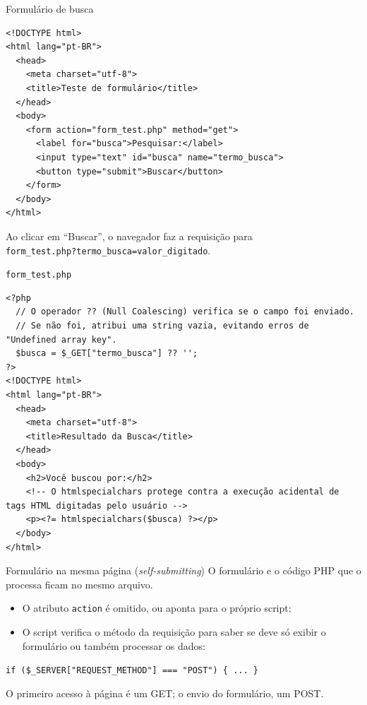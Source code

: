 \documentclass{beamer}
\begin{document}
\begin{frame}[fragile]{Formulário de busca}
	\begin{verbatim}
<!DOCTYPE html>
<html lang="pt-BR">
  <head>
    <meta charset="utf-8">
    <title>Teste de formulário</title>
  </head>
  <body>
    <form action="form_test.php" method="get">
      <label for="busca">Pesquisar:</label>
      <input type="text" id="busca" name="termo_busca">
      <button type="submit">Buscar</button>
    </form>
  </body>
</html>
	\end{verbatim}

	Ao clicar em ``Buscar'', o navegador faz a requisição para\\
	\texttt{form\_test.php?termo\_busca=valor\_digitado}.
\end{frame}

\begin{frame}[fragile]{\texttt{form\_test.php}}
	\begin{verbatim}
<?php
  // O operador ?? (Null Coalescing) verifica se o campo foi enviado.
  // Se não foi, atribui uma string vazia, evitando erros de "Undefined array key".
  $busca = $_GET["termo_busca"] ?? '';
?>
<!DOCTYPE html>
<html lang="pt-BR">
  <head>
    <meta charset="utf-8">
    <title>Resultado da Busca</title>
  </head>
  <body>
    <h2>Você buscou por:</h2>
    <!-- O htmlspecialchars protege contra a execução acidental de tags HTML digitadas pelo usuário -->
    <p><?= htmlspecialchars($busca) ?></p>
  </body>
</html>
	\end{verbatim}
\end{frame}

\begin{frame}{Formulário na mesma página (\emph{self-submitting})}
	O formulário e o código PHP que o processa ficam no mesmo arquivo.

	\vspace{0.2cm}
	\begin{itemize}
		\item O atributo \texttt{action} é omitido, ou aponta para o próprio
		      script;
		\item O script verifica o método da requisição para saber se deve só
		      exibir o formulário ou também processar os dados:
	\end{itemize}

	\vspace{0.2cm}
	\begin{center}
		\texttt{if (\$\_SERVER["REQUEST\_METHOD"] === "POST") \{ ... \}}
	\end{center}

	\vspace{0.2cm}
	O primeiro acesso à página é um GET; o envio do formulário, um POST.
\end{frame}
\end{document}
